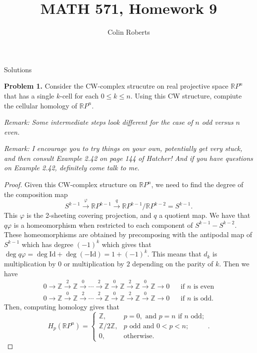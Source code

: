 \documentclass[leqno]{article}
\author{Colin Roberts}
\title{MATH 571, Homework 9}
\theoremstyle{nonumberplain}
\newtheorem{proof}{Proof}
\newcommand{\id}{\mathrm{Id}}
\newcommand{\R}{\mathbb{R}}
\newcommand{\Z}{\mathbb{Z}}
\begin{document}
\maketitle
\begin{large}
\begin{center}
Solutions
\end{center}
\end{large}


\noindent\textbf{Problem 1.} 
Consider the CW-complex strucutre on real projective space $\R P^n$ that has a single $k$-cell for each $0\leq k\leq n$. Using this CW structure, compiute the cellular homology of $\R P^n$.

\noindent \emph{Remark: Some intermediate steps look different for the case of $n$ odd versus $n$ even.}

\noindent \emph{Remark: I encourage you to try things on your own, potentially get very stuck, and then consult Example 2.42 on page 144 of Hatcher! And if you have questions on Example 2.42, definitely come talk to me.}


\begin{proof}
Given this CW-complex structure on $\R P^n$, we need to find the degree of the composition map
\[
S^{k-1}\xrightarrow{\varphi} \R P^{k-1} \xrightarrow{q} \R P^{k-1}/\R P^{k-2} = S^{k-1}.
\]
This $\varphi$ is the 2-sheeting covering projection, and $q$ a quotient map.  We have that $q\varphi$ is a homeomorphism when restricted to each component of $S^{k-1} - S^{k-2}$.  These homeomorphisms are obtained by precomposing with the antipodal map of $S^{k-1}$ which has degree $(-1)^k$ which gives that $\deg q \varphi = \deg \id + \deg (-\id)=1+(-1)^k$.  This means that $d_k$ is multiplication by $0$ or multiplication by $2$ depending on the parity of $k$.  Then we have
\begin{align*}
0\rightarrow \Z \xrightarrow{2} \Z \xrightarrow{0} \cdots \xrightarrow{2} \Z \xrightarrow{0} \Z \xrightarrow{2} \Z \xrightarrow{0} \Z \rightarrow 0 && \textrm{if $n$ is even}\\
0\rightarrow \Z \xrightarrow{0} \Z \xrightarrow{2} \cdots \xrightarrow{2} \Z \xrightarrow{0} \Z \xrightarrow{2} \Z \xrightarrow{0} \Z \rightarrow 0 && \textrm{if $n$ is odd.}
\end{align*}
Then, computing homology gives that
\[
H_p(\R P^n) = 
\begin{cases}
\Z, & p=0, \textrm{ and } p=n \textrm{ if $n$ odd};\\
\Z/2\Z, & \textrm{$p$ odd and $0<p<n$};\\ 
0, & \textrm{otherwise}.
\end{cases}.
\]
\end{proof}
\end{document}
